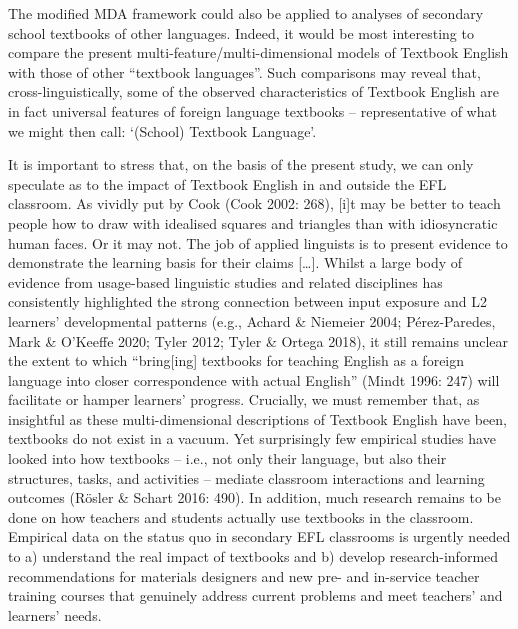 \documentclass[
  letterpaper,
  DIV=11,
  numbers=noendperiod]{scrreprt}
\begin{document}
The modified MDA framework could also be applied to analyses of
secondary school textbooks of other languages. Indeed, it would be most
interesting to compare the present multi-feature/multi-dimensional
models of Textbook English with those of other ``textbook languages''.
Such comparisons may reveal that, cross-linguistically, some of the
observed characteristics of Textbook English are in fact universal
features of foreign language textbooks -- representative of what we
might then call: `(School) Textbook Language'.

It is important to stress that, on the basis of the present study, we
can only speculate as to the impact of Textbook English in and outside
the EFL classroom. As vividly put by Cook (Cook 2002: 268), {[}i{]}t may
be better to teach people how to draw with idealised squares and
triangles than with idiosyncratic human faces. Or it may not. The job of
applied linguists is to present evidence to demonstrate the learning
basis for their claims {[}\ldots{]}. Whilst a large body of evidence
from usage-based linguistic studies and related disciplines has
consistently highlighted the strong connection between input exposure
and L2 learners' developmental patterns (e.g., Achard \& Niemeier 2004;
Pérez-Paredes, Mark \& O'Keeffe 2020; Tyler 2012; Tyler \& Ortega 2018),
it still remains unclear the extent to which ``bring{[}ing{]} textbooks
for teaching English as a foreign language into closer correspondence
with actual English'' (Mindt 1996: 247) will facilitate or hamper
learners' progress. Crucially, we must remember that, as insightful as
these multi-dimensional descriptions of Textbook English have been,
textbooks do not exist in a vacuum. Yet surprisingly few empirical
studies have looked into how textbooks -- i.e., not only their language,
but also their structures, tasks, and activities -- mediate classroom
interactions and learning outcomes (Rösler \& Schart 2016: 490). In
addition, much research remains to be done on how teachers and students
actually use textbooks in the classroom. Empirical data on the status
quo in secondary EFL classrooms is urgently needed to a) understand the
real impact of textbooks and b) develop research-informed
recommendations for materials designers and new pre- and in-service
teacher training courses that genuinely address current problems and
meet teachers' and learners' needs.
\end{document}
